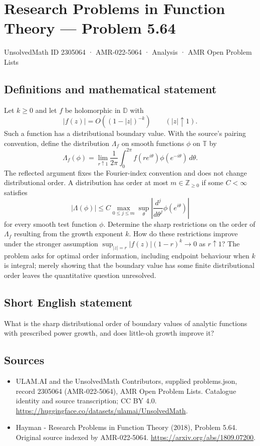 \documentclass[11pt,a4paper]{article}
\begin{document}
\section*{Research Problems in Function Theory — Problem 5.64}\label{2305064}
{\small UnsolvedMath ID 2305064 · AMR-022-5064 · Analysis · AMR Open Problem Lists}
\subsection{Definitions and mathematical statement}
Let $k\ge0$ and let $f$ be holomorphic in $\mathbb D$ with
\[
|f(z)|=O((1-|z|)^{-k})\qquad(|z|\uparrow1).
\]
Such a function has a distributional boundary value. With the source's pairing convention, define the distribution $\Lambda_f$ on smooth functions $\phi$ on $\mathbb T$ by
\[
\Lambda_f(\phi)=\lim_{r\uparrow1}\frac1{2\pi}
\int_0^{2\pi}f(re^{i\theta})\phi(e^{-i\theta})\,d\theta.
\]
The reflected argument fixes the Fourier-index convention and does not change distributional order. A distribution has order at most $m\in\mathbb Z_{\ge0}$ if some $C<\infty$ satisfies
\[
|\Lambda(\phi)|\le C\max_{0\le j\le m}
\sup_\theta\left|\frac{d^j}{d\theta^j}\phi(e^{i\theta})\right|
\]
for every smooth test function $\phi$.
Determine the sharp restrictions on the order of $\Lambda_f$ resulting from the growth exponent $k$. How do these restrictions improve under the stronger assumption
$\sup_{|z|=r}|f(z)|(1-r)^k\to0$ as $r\uparrow1$?
The problem asks for optimal order information, including endpoint behaviour when $k$ is integral; merely showing that the boundary value has some finite distributional order leaves the quantitative question unresolved.
\subsection{Short English statement}
What is the sharp distributional order of boundary values of analytic functions with prescribed power growth, and does little-oh growth improve it?
\subsection{Sources}
\begin{itemize}
\item[S1] ULAM.AI and the UnsolvedMath Contributors, supplied problems.json, record 2305064 (AMR-022-5064), AMR Open Problem Lists. Catalogue identity and source transcription; CC BY 4.0.
\url{https://huggingface.co/datasets/ulamai/UnsolvedMath}.
\item[S2] Hayman - Research Problems in Function Theory (2018), Problem 5.64. Original source indexed by AMR-022-5064.
\url{https://arxiv.org/abs/1809.07200}.
\end{itemize}
\end{document}
